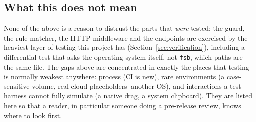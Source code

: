 \subsection{What this does not mean}

None of the above is a reason to distrust the parts that \emph{were} tested: the
guard, the rule matcher, the HTTP middleware and the endpoints are exercised by the
heaviest layer of testing this project has (Section~\ref{sec:verification}), including
a differential test that asks the operating system itself, not \texttt{fsb}, which
paths are the same file.  The gaps above are concentrated in exactly the places that
testing is normally weakest anywhere: process (CI is new), rare environments
(a case-sensitive volume, real cloud placeholders, another OS), and interactions a
test harness cannot fully simulate (a native drag, a system clipboard).  They are
listed here so that a reader, in particular someone doing a pre-release review, knows
where to look first.
